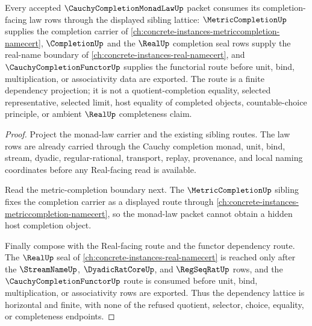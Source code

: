 \begin{theorem}
\label{thm:cauchy-completion-monad-law-sibling-route}
Every accepted $\CauchyCompletionMonadLawUp$ packet consumes its completion-facing law rows through the displayed sibling lattice: $\MetricCompletionUp$ supplies the completion carrier of \autoref{ch:concrete-instances-metriccompletion-namecert}, $\CompletionUp$ and the $\RealUp$ completion seal rows supply the real-name boundary of \autoref{ch:concrete-instances-real-namecert}, and $\CauchyCompletionFunctorUp$ supplies the functorial route before unit, bind, multiplication, or associativity data are exported. The route is a finite dependency projection; it is not a quotient-completion equality, selected representative, selected limit, host equality of completed objects, countable-choice principle, or ambient $\RealUp$ completeness claim.
\end{theorem}
\begin{proof}
Project the monad-law carrier and the existing sibling routes. The law rows are already carried through the Cauchy completion monad, unit, bind, stream, dyadic, regular-rational, transport, replay, provenance, and local naming coordinates before any Real-facing read is available.

Read the metric-completion boundary next. The $\MetricCompletionUp$ sibling fixes the completion carrier as a displayed route through \autoref{ch:concrete-instances-metriccompletion-namecert}, so the monad-law packet cannot obtain a hidden host completion object.

Finally compose with the Real-facing route and the functor dependency route. The $\RealUp$ seal of \autoref{ch:concrete-instances-real-namecert} is reached only after the $\StreamNameUp$, $\DyadicRatCoreUp$, and $\RegSeqRatUp$ rows, and the $\CauchyCompletionFunctorUp$ route is consumed before unit, bind, multiplication, or associativity rows are exported. Thus the dependency lattice is horizontal and finite, with none of the refused quotient, selector, choice, equality, or completeness endpoints.
\end{proof}
